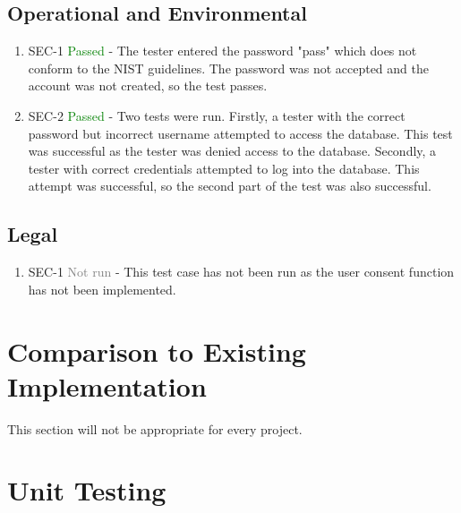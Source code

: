 \documentclass[12pt, titlepage]{article}
\begin{document}
\subsection{Operational and Environmental}
\begin{enumerate}
  \item SEC-1 \textcolor{green}{Passed} - The tester entered the password "pass" which does not conform to the NIST guidelines. The password was not accepted and the account was not created, so the test passes.
  \item SEC-2 \textcolor{green}{Passed} - Two tests were run. Firstly, a tester with the correct password but incorrect username attempted to access the database. This test was successful as the tester was denied access to the database. Secondly, a tester with correct credentials attempted to log into the database. This attempt was successful, so the second part of the test was also successful.
\end{enumerate}

\subsection{Legal}
\begin{enumerate}
  \item SEC-1 \textcolor{gray}{Not run} - This test case has not been run as the user consent function has not been implemented.
\end{enumerate}


\section{Comparison to Existing Implementation}

This section will not be appropriate for every project.

\section{Unit Testing}
\end{document}
